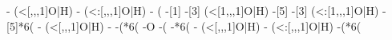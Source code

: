 \begin{struct}
{                                                                                        -
                                                                                            (<[,,,1]O|H)
                                                                                        -
                                                                                            (<:[,,,1]O|H)
                                                                                        -
                                                                                            (
                                                                                                -[1]
                                                                                                -[3]
                                                                                                    (<[1,,,1]O|H)
                                                                                                -[5]
                                                                                                -[3]
                                                                                                    (<:[1,,,1]O|H)
                                                                                                -[5]*6(
                                                                                                    -
                                                                                                        (<[,,,1]O|H)
                                                                                                    -
                                                                                                    -(*6(
                                                                                                        -O
                                                                                                        -(
                                                                                                            -*6(
                                                                                                                -
                                                                                                                    (<[,,,1]O|H)
                                                                                                                -
                                                                                                                    (<:[,,,1]O|H)
                                                                                                                -(*6(
}
\end{struct}
